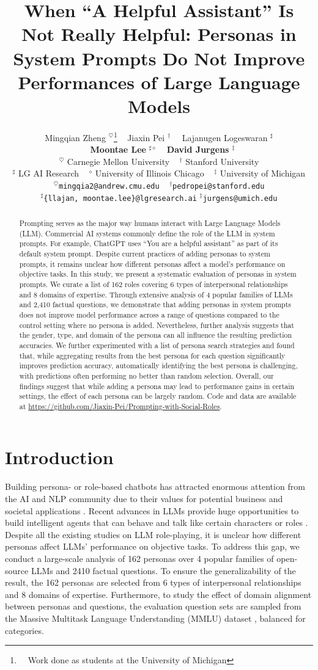 \documentclass[11pt]{article}
\title{When ``A Helpful Assistant'' Is Not Really Helpful: Personas in System Prompts Do Not Improve  Performances of Large Language Models}
\author{
    Mingqian Zheng $^{\heartsuit}$\thanks{~~Work done as students at the University of Michigan} ~ Jiaxin Pei $^{\dagger}$\samethanks \ ~ Lajanugen Logeswaran $^{\sharp}$ \\
    ~ \textbf{Moontae Lee} $^{\sharp \diamond}$ ~ \textbf{David Jurgens} $^{\ddagger}$ \vspace{0.1cm}\\
    $^\heartsuit$ Carnegie Mellon University ~
    $^{\dagger}$ Stanford University \vspace{0.1cm} \\
    $^{\sharp}$ LG AI Research ~
    $^{\diamond}$ University of Illinois Chicago ~
    $^{\ddagger}$ University of Michigan \\
    { \tt $^{\heartsuit}$mingqia2@andrew.cmu.edu} ~
    { \tt $^{\dagger}$pedropei@stanford.edu}\\
    { \tt $^{\sharp}$\{llajan, moontae.lee\}@lgresearch.ai} 
    { \tt $^{\ddagger}$jurgens@umich.edu} \\
}
\begin{document}
\maketitle
\begin{abstract}
Prompting serves as the major way humans interact with Large Language Models (LLM). Commercial AI systems commonly define the role of the LLM in system prompts. For example, ChatGPT uses ``You are a helpful assistant'' as part of its default system prompt. Despite current practices of adding personas to system prompts, it remains unclear how different personas affect a model's performance on objective tasks. In this study, we present a systematic evaluation of personas in system prompts. We curate a list of 162 roles covering 6 types of interpersonal relationships and 8 domains of expertise. Through extensive analysis of 4 popular families of LLMs and 2,410 factual questions, we demonstrate that adding personas in system prompts does not improve model performance across a range of questions compared to the control setting where no persona is added. Nevertheless, further analysis suggests that the gender, type, and domain of the persona can all influence the resulting prediction accuracies. We further experimented with a list of persona search strategies and found that, while aggregating results from the best persona for each question significantly improves prediction accuracy, automatically identifying the best persona is challenging, with predictions often performing no better than random selection. Overall, our findings suggest that while adding a persona may lead to performance gains in certain settings, the effect of each persona can be largely random. Code and data are available at \url{https://github.com/Jiaxin-Pei/Prompting-with-Social-Roles}.
\end{abstract}

\section{Introduction}

Building persona- or role-based chatbots has attracted enormous attention from the AI and NLP community due to their values for potential business and societal applications \citep{pataranutaporn2021ai}. Recent advances in LLMs provide huge opportunities to build intelligent agents that can behave and talk like certain characters or roles \citep{wang2023rolellm}. Despite all the existing studies on LLM role-playing, it is unclear how different personas affect LLMs' performance on objective tasks. To address this gap, we conduct a large-scale analysis of 162 personas over 4 popular families of open-source LLMs and 2410 factual questions. To ensure the generalizability of the result, the 162 personas are selected from 6 types of interpersonal relationships and 8 domains of expertise. Furthermore, to study the effect of domain alignment between personas and questions, the evaluation question sets are sampled from the Massive Multitask Language Understanding (MMLU) dataset \citep{hendryckstest2021}, balanced for categories.
\end{document}
